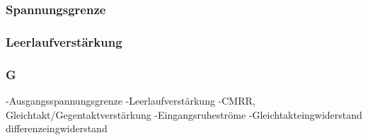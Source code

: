 \subsubsection{Spannungsgrenze}

\subsubsection{Leerlaufverstärkung}

\subsubsection{G}
-Ausgangsspannungsgrenze
-Leerlaufverstärkung
-CMRR, Gleichtakt/Gegentaktverstärkung
-Eingangsruheströme
-Gleichtakteingwiderstand differenzeingwiderstand